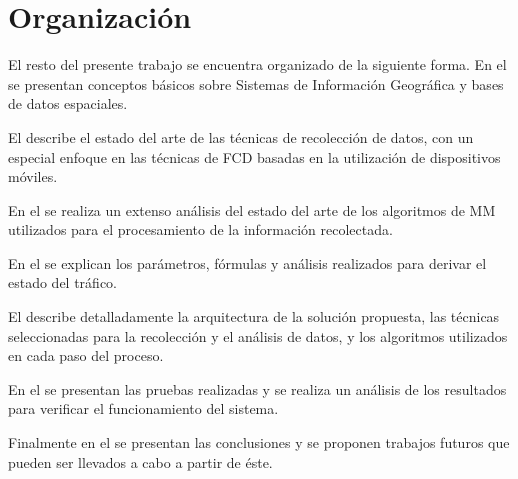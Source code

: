 \section{Organización}

El resto del presente trabajo se encuentra organizado de la siguiente forma. En el  se presentan conceptos básicos sobre Sistemas de Información Geográfica y bases de datos espaciales.

El  describe el estado del arte de las técnicas de recolección de datos, con un especial enfoque en las técnicas de FCD basadas en la utilización de dispositivos móviles. 

En el  se realiza un extenso análisis del estado del arte de los algoritmos de MM utilizados para el procesamiento de la información recolectada.

En el  se explican los parámetros, fórmulas y análisis realizados para derivar el estado del tráfico.

El  describe detalladamente la arquitectura de la solución propuesta, las técnicas seleccionadas para la recolección y el análisis de datos, y los algoritmos utilizados en cada paso del proceso.

En el  se presentan las pruebas realizadas y se realiza un análisis de los resultados para verificar el funcionamiento del sistema.

Finalmente en el  se presentan las conclusiones y se proponen trabajos futuros que pueden ser llevados a cabo a partir de éste.
